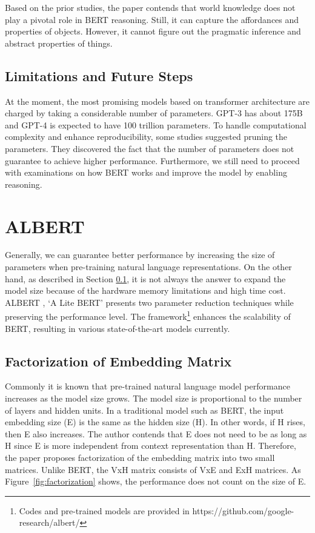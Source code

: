 \documentclass[letterpaper, 11pt]{article}
\begin{document}
Based on the prior studies, the paper contends that world knowledge does not play a pivotal role in BERT reasoning. Still, it can capture the affordances and properties of objects. However, it cannot figure out the pragmatic inference and abstract properties of things.

\subsection{Limitations and Future Steps}
\label{sec:bert-future-steps}
At the moment, the most promising models based on transformer architecture are charged by taking a considerable number of parameters. GPT-3 has about 175B and GPT-4 is expected to have 100 trillion parameters. To handle computational complexity and enhance reproducibility, some studies suggested pruning the parameters. They discovered the fact that the number of parameters does not guarantee to achieve higher performance. Furthermore, we still need to proceed with examinations on how BERT works and improve the model by enabling reasoning.


\section{ALBERT}
\label{sec:albert}
Generally, we can guarantee better performance by increasing the size of parameters when pre-training natural language representations. On the other hand, as described in Section \ref{sec:bert-future-steps}, it is not always the answer to expand the model size because of the hardware memory limitations and high time cost. ALBERT \citep{Lan2020}, `A Lite BERT' presents two parameter reduction techniques while preserving the performance level. The framework\footnote{Codes and pre-trained models are provided in https://github.com/google-research/albert/} enhances the scalability of BERT, resulting in various state-of-the-art models currently.

\subsection{Factorization of Embedding Matrix}
\label{sec:fep}
Commonly it is known that pre-trained natural language model performance increases as the model size grows. The model size is proportional to the number of layers and hidden units. In a traditional model such as BERT, the input embedding size (E) is the same as the hidden size (H). In other words, if H rises, then E also increases. The author contends that E does not need to be as long as H since E is more independent from context representation than H. Therefore, the paper proposes factorization of the embedding matrix into two small matrices. Unlike BERT, the VxH matrix consists of VxE and ExH matrices. As Figure~\ref{fig:factorization} shows, the performance does not count on the size of E.
\end{document}
